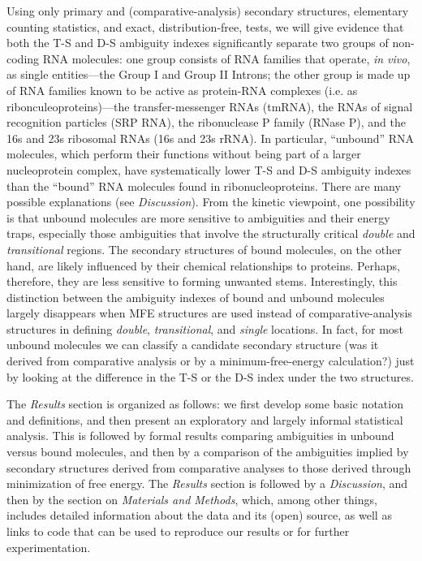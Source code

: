 \documentclass[10pt,letterpaper]{article}
\begin{document}
Using only primary and (comparative-analysis) secondary structures, elementary counting statistics, 
and exact, distribution-free, tests,
we will give evidence that
both the T-S and D-S ambiguity indexes 
significantly separate two groups of non-coding RNA molecules: one group consists of  RNA families that operate, {\em in vivo}, as single entities---the Group I and Group II Introns;
the other group is made up of RNA families  known to be active as protein-RNA complexes (i.e. as ribonculeoproteins)---the transfer-messenger RNAs (tmRNA), the RNAs of signal recognition particles (SRP RNA), the ribonuclease P family (RNase P), and the 16s and 23s ribosomal RNAs (16s and 23s rRNA). In particular, ``unbound'' RNA molecules, which perform their functions without being part of a larger nucleoprotein complex, have systematically lower T-S and D-S ambiguity indexes than the ``bound'' RNA molecules found in ribonucleoproteins. 
There are many possible explanations (see {\em Discussion}). From the kinetic viewpoint, one possibility is that unbound molecules are more sensitive to ambiguities and their energy traps, especially those ambiguities that involve the structurally critical {\em double} and {\em transitional} regions. The secondary structures of bound molecules, on the other hand, are likely influenced by their chemical relationships to proteins. Perhaps, therefore, they are less sensitive to forming unwanted stems. Interestingly, this distinction between the ambiguity indexes of bound and unbound molecules largely disappears when MFE structures are used instead of comparative-analysis structures in defining {\em double}, {\em transitional}, and {\em single} locations. In fact, for most unbound molecules we can classify a candidate secondary
structure (was it derived from comparative analysis or by a minimum-free-energy calculation?) just by looking at the difference in the T-S or the D-S index under the two structures.

The {\em Results} section is organized as follows:  we first develop some basic notation and definitions, and then present an exploratory and largely informal statistical analysis. This is followed by formal results comparing ambiguities in unbound versus bound molecules, and then by a comparison of the ambiguities implied by secondary structures derived from comparative analyses to those derived through minimization of free energy. 
The {\em Results} section is followed by a {\em Discussion}, and then by the section on {\em Materials and Methods}, which, among other things, includes detailed information about the data and its (open) source, as well as links to code that can be used to reproduce our results or for further experimentation. 
\end{document}
